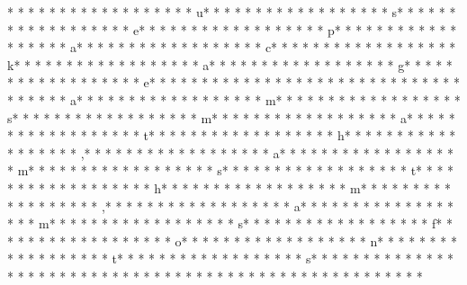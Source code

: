 * * *  * * *  * * *  *  * * *  *  * * *  * u* * *  * * *  * * *  *  * * *  *  * * *  * s* * *  * * *  * * *  *  * * *  *  * * *  * e* * *  * * *  * * *  *  * * *  *  * * *  * p* * *  * * *  * * *  *  * * *  *  * * *  * a* * *  * * *  * * *  *  * * *  *  * * *  * c* * *  * * *  * * *  *  * * *  *  * * *  * k* * *  * * *  * * *  *  * * *  *  * * *  * a* * *  * * *  * * *  *  * * *  *  * * *  * g* * *  * * *  * * *  *  * * *  *  * * *  * e* * *  * * *  * * *  *  * * *  *  * * *  * {* * *  * * *  * * *  *  * * *  *  * * *  * a* * *  * * *  * * *  *  * * *  *  * * *  * m* * *  * * *  * * *  *  * * *  *  * * *  * s* * *  * * *  * * *  *  * * *  *  * * *  * m* * *  * * *  * * *  *  * * *  *  * * *  * a* * *  * * *  * * *  *  * * *  *  * * *  * t* * *  * * *  * * *  *  * * *  *  * * *  * h* * *  * * *  * * *  *  * * *  *  * * *  * ,* * *  * * *  * * *  *  * * *  *  * * *  * a* * *  * * *  * * *  *  * * *  *  * * *  * m* * *  * * *  * * *  *  * * *  *  * * *  * s* * *  * * *  * * *  *  * * *  *  * * *  * t* * *  * * *  * * *  *  * * *  *  * * *  * h* * *  * * *  * * *  *  * * *  *  * * *  * m* * *  * * *  * * *  *  * * *  *  * * *  * ,* * *  * * *  * * *  *  * * *  *  * * *  * a* * *  * * *  * * *  *  * * *  *  * * *  * m* * *  * * *  * * *  *  * * *  *  * * *  * s* * *  * * *  * * *  *  * * *  *  * * *  * f* * *  * * *  * * *  *  * * *  *  * * *  * o* * *  * * *  * * *  *  * * *  *  * * *  * n* * *  * * *  * * *  *  * * *  *  * * *  * t* * *  * * *  * * *  *  * * *  *  * * *  * s* * *  * * *  * * *  *  * * *  *  * * *  * }* * *  * * *  * * *  *  * * *  *  * * *  * 
* * *  * * *  * * *  *  * * *  *  * * *  * %
